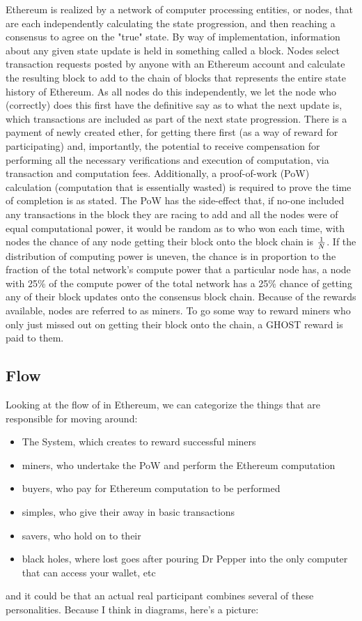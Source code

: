 \documentclass[10pt,a4paper]{article}
\begin{document}
Ethereum is realized by a network of computer processing entities, or nodes, that are each independently calculating the state progression, and then reaching a consensus to agree on the "true" state. By way of implementation, information about any given state update is held in something called a block. Nodes select transaction requests posted by anyone with an Ethereum account and calculate the resulting block to add to the chain of blocks that represents the entire state history of Ethereum. As all nodes do this independently, we let the node who (correctly) does this first have the definitive say as to what the next update is, \ie which transactions are included as part of the next state progression. There is a payment of newly created ether, \R for getting there first (as a way of reward for participating) and, importantly, the potential to receive compensation for performing all the necessary verifications and execution of computation, via transaction and computation fees. Additionally, a proof-of-work (PoW) calculation (computation that is essentially wasted) is required to prove the time of completion is as stated. The PoW has the side-effect that, if no-one included any transactions in the block they are racing to add and all the nodes were of equal computational power, it would be random as to who won each time, \ie with \N nodes the chance of any node getting their block onto the block chain is $\frac{1}{{N}}$. If the distribution of computing power is uneven, the chance is in proportion to the fraction of the total network's compute power that a particular node has, \eg a node with 25\% of the compute power of the total network has a 25\% chance of getting any of their block updates onto the consensus block chain. Because of the rewards available, nodes are referred to as miners. To go some way to reward miners who only just missed out on getting their block onto the chain, a GHOST reward is paid to them.

\subsection*{\ether Flow}

Looking at the flow of \ether in Ethereum, we can categorize the things that are responsible for \ether moving around:
\begin{itemize} \itemsep=0pt
\item The System, which creates \ether to reward successful miners
\item miners, who undertake the PoW and perform the Ethereum computation 
\item buyers, who pay for Ethereum computation to be performed
\item simples, who give their \ether away in basic transactions
\item savers, who hold on to their \ether
\item black holes, where lost \ether goes after pouring Dr Pepper into the only computer that can access your wallet, etc
\end{itemize}
and it could be that an actual real participant combines several of these personalities. Because I think in diagrams, here's a picture:
\end{document}
